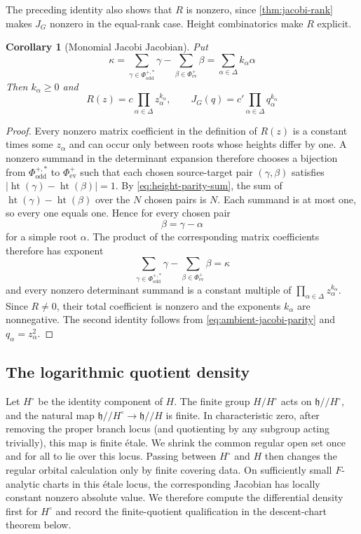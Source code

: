 \documentclass[11pt]{amsart}
\newtheorem{corollary}[corollary]{Corollary}
\theoremstyle{definition}
\theoremstyle{remark}
\newcommand{\abs}[1]{\lvert #1\rvert}
\newcommand{\h}{\mathfrak h}
\begin{document}
The preceding identity also shows that $R$ is nonzero, since
\cref{thm:jacobi-rank} makes $J_G$ nonzero in the equal-rank case.
Height combinatorics make $R$ explicit.

\begin{corollary}[Monomial Jacobi Jacobian]\label{cor:monomial-jacobi-jacobian}
Put
\begin{equation}\label{eq:kappa-root}
 \kappa=
 \sum_{\gamma\in\Phi_{\mathrm{odd}}^{+,*}}\gamma
 -\sum_{\beta\in\Phi_{\mathrm{ev}}^+}\beta
 =\sum_{\alpha\in\Delta}k_\alpha\alpha
\end{equation}
Then $k_\alpha\geq0$ and
\begin{equation}\label{eq:R-monomial}
 R(z)=c\prod_{\alpha\in\Delta}z_\alpha^{k_\alpha},
 \qquad
 J_G(q)=c'\prod_{\alpha\in\Delta}q_\alpha^{k_\alpha}
\end{equation}
\end{corollary}

\begin{proof}
Every nonzero matrix coefficient in the definition of $R(z)$ is a constant
times some $z_\alpha$ and can occur only between roots whose heights differ
by one.  A nonzero summand in the determinant expansion therefore chooses a
bijection from $\Phi_{\mathrm{odd}}^{+,*}$ to $\Phi_{\mathrm{ev}}^+$ such
that each chosen source-target pair $(\gamma,\beta)$ satisfies
$\abs{\operatorname{ht}(\gamma)-\operatorname{ht}(\beta)}=1$.  By
\eqref{eq:height-parity-sum}, the sum of
$\operatorname{ht}(\gamma)-\operatorname{ht}(\beta)$ over the $N$ chosen
pairs is $N$.  Each summand is at most one, so every one equals one.  Hence
for every chosen pair
\[
 \beta=\gamma-\alpha
\]
for a simple root $\alpha$.  The product of the corresponding matrix
coefficients therefore has exponent
\[
 \sum_{\gamma\in\Phi_{\mathrm{odd}}^{+,*}}\gamma
 -\sum_{\beta\in\Phi_{\mathrm{ev}}^+}\beta
 =\kappa
\]
and every nonzero determinant summand is a constant multiple of
$\prod_{\alpha\in\Delta}z_\alpha^{k_\alpha}$.
Since $R\neq0$, their total coefficient is nonzero and the exponents
$k_\alpha$ are nonnegative.  The second identity follows from
\eqref{eq:ambient-jacobi-parity} and $q_\alpha=z_\alpha^2$.
\end{proof}

\subsection{The logarithmic quotient density}

Let $H^\circ$ be the identity component of $H$.  The finite group
$H/H^\circ$ acts on $\h/\!/H^\circ$, and the natural map
$\h/\!/H^\circ\to\h/\!/H$ is finite.  In characteristic zero, after removing
the proper branch locus (and quotienting by any subgroup acting trivially),
this map is finite \'etale.  We shrink the common regular open set once and
for all to lie over this locus.  Passing between $H^\circ$ and $H$ then
changes the regular orbital calculation only by finite covering data.  On
sufficiently small $F$-analytic charts in this \'etale locus, the corresponding
Jacobian has locally constant nonzero absolute value.  We therefore compute
the differential density first for $H^\circ$ and record the finite-quotient
qualification in the descent-chart theorem below.
\end{document}
